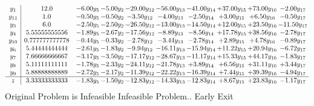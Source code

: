 \documentclass[9pt]{article}
\begin{document}
\[\begin{array}{c| c c@{\hskip 2pt} c@{\hskip 2pt} c@{\hskip 2pt} c@{\hskip 2pt} c@{\hskip 2pt} c@{\hskip 2pt} c@{\hskip 2pt} c@{\hskip 2pt} }
 y_{1}   &  12.0 & -6.00 y_{5} & -5.00 y_{2} & -29.00 y_{12} & -56.00 y_{13} & -41.00 y_{14} & + 37.00 y_{15} & + 73.00 y_{16} & -2.00 y_{17}\\
 y_{11}   &  1.0 & -0.50 y_{5} & -0.50 y_{2} & -3.50 y_{12} & -4.00 y_{13} & -2.50 y_{14} & +  3.00 y_{15} & +  6.50 y_{16} & -0.50 y_{17}\\
 y_{3}   &  6.0 & -2.50 y_{5} & -2.50 y_{2} & -26.50 y_{12} & -13.00 y_{13} & -14.50 y_{14} & + 12.00 y_{15} & + 23.50 y_{16} & -11.50 y_{17}\\
 y_{4}   &  5.55555555556 & -1.89 y_{5} & -2.67 y_{2} & -17.56 y_{12} & -8.89 y_{13} & -8.56 y_{14} & + 17.78 y_{15} & + 38.56 y_{16} & -2.78 y_{17}\\
 y_{10}   &  0.777777777778 & -0.44 y_{5} & -0.33 y_{2} & -2.78 y_{12} & -3.44 y_{13} & -2.78 y_{14} & +  2.89 y_{15} & +  4.78 y_{16} & -0.89 y_{17}\\
 y_{6}   &  5.44444444444 & -2.61 y_{5} & -1.83 y_{2} & -9.94 y_{12} & -16.11 y_{13} & -15.94 y_{14} & + 11.22 y_{15} & + 20.94 y_{16} & -6.72 y_{17}\\
 y_{7}   &  7.66666666667 & -3.17 y_{5} & -3.50 y_{2} & -17.17 y_{12} & -28.67 y_{13} & -11.17 y_{14} & + 15.33 y_{15} & + 44.17 y_{16} & -1.83 y_{17}\\
 y_{8}   &  5.11111111111 & -1.78 y_{5} & -2.33 y_{2} & -24.11 y_{12} & -21.78 y_{13} & +  3.89 y_{14} & +  6.56 y_{15} & + 31.11 y_{16} & +  3.44 y_{17}\\
 y_{9}   &  5.88888888889 & -2.72 y_{5} & -2.17 y_{2} & -11.39 y_{12} & -22.22 y_{13} & -16.39 y_{14} & +  7.44 y_{15} & + 39.39 y_{16} & -4.94 y_{17}\\
\hline
z    &  3.33333333333 & -1.83 y_{5} & -1.50 y_{2} & -12.83 y_{12} & -14.33 y_{13} & -12.83 y_{14} & +  8.67 y_{15} & + 23.83 y_{16} & -1.17 y_{17}\\
\end{array}\]
Original Problem is Infeasible
Infeasible Problem.. Early Exit
\end{document}

